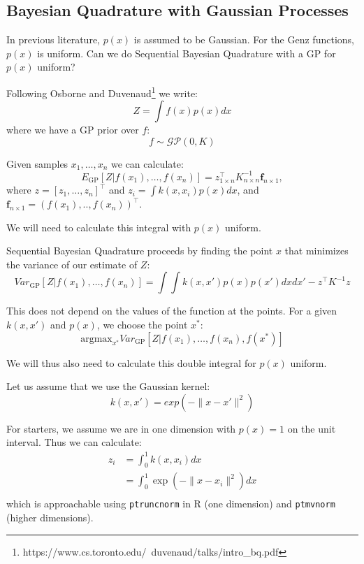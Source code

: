 \subsection*{Bayesian Quadrature with Gaussian Processes}
In previous literature, $p(x)$ is assumed to be Gaussian. For the Genz functions, $p(x)$ is uniform. Can we do Sequential Bayesian Quadrature with a GP for $p(x)$ uniform?

Following Osborne \cite{GPSQ} and Duvenaud\footnote{https://www.cs.toronto.edu/~duvenaud/talks/intro_bq.pdf} we write:
\begin{equation}
    Z = \int f(x) p(x) dx
\end{equation}
where we have a GP prior over $f$:
\begin{equation}
    f \sim \mathcal{GP}(0,K)
\end{equation}
    
Given samples $x_1, \ldots, x_n$ we can calculate:
\begin{equation}
    E_{\mbox{GP}}\left[Z | f(x_1), \ldots, f(x_n)\right] = z^{\top}_{1\times n} K_{n\times n}^{-1}\pmb{f}_{n\times 1},
\end{equation}
where $z = [z_1, \ldots, z_n]^{\top}$ and $z_i = \int k(x,x_i)p(x)dx$, and $\pmb{f}_{n\times 1} = (f(x_1),..,f(x_n))^{\top}$. 

We will need to calculate this integral with $p(x)$ uniform.

Sequential Bayesian Quadrature proceeds by finding the point $x$ that minimizes the variance of our estimate of $Z$:
\begin{equation}
    Var_{\mbox{GP}}\left[Z | f(x_1), \ldots, f(x_n)\right] = \int \int k(x,x')p(x)p(x')dxdx' - z^{\top}K^{-1}z
\end{equation}

This does not depend on the values of the function at the points. For a given $k(x,x')$ and $p(x)$, we choose the point $x^*$:
\begin{equation}
    \mbox{argmax}_{x^*} Var_{\mbox{GP}}\left[Z | f(x_1), \ldots, f(x_n), f(x^*) \right] 
\end{equation}

We will thus also need to calculate this double integral for $p(x)$ uniform.

Let us assume that we use the Gaussian kernel:
\begin{equation}
    k(x,x') = exp(-\|x-x'\|^2)
\end{equation}

For starters, we assume we are in one dimension with $p(x) = 1$ on the unit interval.
Thus we can calculate:
\begin{align}
    z_i & = \int_{0}^1 k(x,x_i) dx \\
    & = \int_0^1 \exp(-\|x-x_i\|^2) dx \\
\end{align}
which is approachable using \texttt{ptruncnorm} in R (one dimension) and \texttt{ptmvnorm} (higher dimensions).

